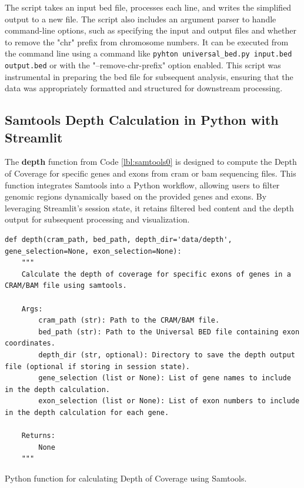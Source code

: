 The script takes an input \ac{bed} file, processes each line, and writes the simplified output to a new file. The script also includes an argument parser to handle command-line options, such as specifying the input and output files and whether to remove the "chr" prefix from chromosome numbers. It can be executed from the command line using a command like \texttt{pyhton universal\_bed.py input.bed output.bed} or with the "--remove-chr-prefix" option enabled. This script was instrumental in preparing the \ac{bed} file for subsequent analysis, ensuring that the data was appropriately formatted and structured for downstream processing.

\subsection{Samtools Depth Calculation in Python with Streamlit}

The \textbf{depth} function from Code \ref{lbl:samtools0} is designed to compute the Depth of Coverage for specific genes and exons from \ac{cram} or \ac{bam} sequencing files. This function integrates Samtools into a Python workflow, allowing users to filter genomic regions dynamically based on the provided genes and exons. By leveraging Streamlit's session state, it retains filtered \ac{bed} content and the depth output for subsequent processing and visualization.

\begin{longlisting}
    \begin{verbatim}
def depth(cram_path, bed_path, depth_dir='data/depth', gene_selection=None, exon_selection=None):
    """
    Calculate the depth of coverage for specific exons of genes in a CRAM/BAM file using samtools.

    Args:
        cram_path (str): Path to the CRAM/BAM file.
        bed_path (str): Path to the Universal BED file containing exon coordinates.
        depth_dir (str, optional): Directory to save the depth output file (optional if storing in session state).
        gene_selection (list or None): List of gene names to include in the depth calculation.
        exon_selection (list or None): List of exon numbers to include in the depth calculation for each gene.

    Returns:
        None
    """
    \end{verbatim}
    \caption{Python function for calculating Depth of Coverage using Samtools.}
    \label{lbl:samtools0}
    \end{longlisting}


